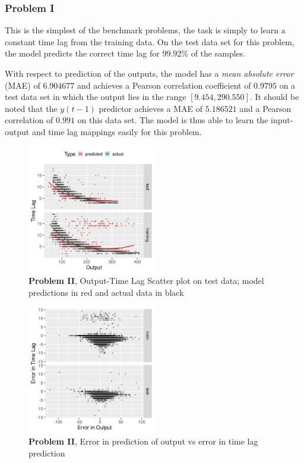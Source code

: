 \documentclass[runningheads]{llncs}
\begin{document}
\subsubsection{Problem I}

This is the simplest of the benchmark problems, the task is simply to learn a constant time lag from 
the training data. On the test data set for this problem, the model predicts the correct time lag for 
$99.92\%$ of the samples. 

With respect to prediction of the outputs, the model has a \emph{mean absolute error} (MAE) of 
$6.904677$ and achieves a Pearson correlation coefficient of $0.9795$ on a test data set in which the 
output lies in the range $[9.454, 290.550]$. It should be noted that the $y(t - 1)$ predictor 
achieves a MAE of $5.186521$ and a Pearson correlation of $0.991$ on this data set. The model is 
thus able to learn the input-output and time lag mappings easily for this problem.

\begin{figure}[h]
\vspace{.3in}
\centerline{\includegraphics[width=0.5\textwidth]{figures/exp2_scatter_v_tl.png}}
\vspace{.3in}
\caption{\textbf{Problem II}, Output-Time Lag Scatter plot on test data; model predictions in red and actual data in black}
\label{fig:problem2_scatter}
\end{figure}

\begin{figure}[h]
\vspace{.3in}
\centerline{\includegraphics[width=0.5\textwidth]{figures/exp2_scatter_errors.png}}
\vspace{.3in}
\caption{\textbf{Problem II}, Error in prediction of output vs error in time lag prediction}
\label{fig:problem2_error}
\end{figure}
\end{document}
